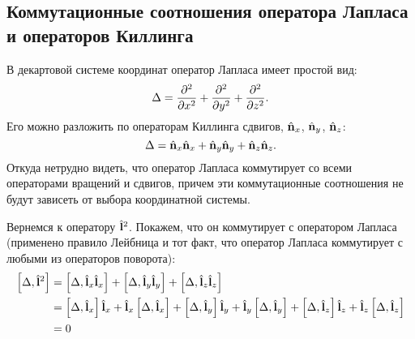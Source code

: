\documentclass[12pt,a4paper]{article}
\begin{document}

    \subsection{Коммутационные соотношения оператора Лапласа и операторов Киллинга}

        В декартовой системе координат оператор Лапласа имеет простой вид:
        \begin{equation}
            \Delta = \pdv[2]{x} + \pdv[2]{y} + \pdv[2]{z} .
        \end{equation}
        Его можно разложить по операторам Киллинга сдвигов, $\hat{\mathbf{n}}_x$, $\hat{\mathbf{n}}_y$, $\hat{\mathbf{n}}_z$:
        \begin{equation}
            \Delta = \hat{\mathbf{n}}_x\hat{\mathbf{n}}_x + \hat{\mathbf{n}}_y\hat{\mathbf{n}}_y + \hat{\mathbf{n}}_z\hat{\mathbf{n}}_z .
        \end{equation}
        Откуда нетрудно видеть, что оператор Лапласа коммутирует со всеми операторами вращений и сдвигов, причем эти коммутационные соотношения не будут зависеть от выбора координатной системы.

        Вернемся к оператору $\hat{\mathbf{l}}^2$. Покажем, что он коммутирует с оператором Лапласа (применено правило Лейбница и тот факт, что оператор Лапласа коммутирует с любыми из операторов поворота):
        \begin{equation}\begin{aligned}
            \left[ \Delta, \hat{\mathbf{l}}^2 \right]
                &= \left[ \Delta, \hat{\mathbf{l}}_x \hat{\mathbf{l}}_x \right]
                    + \left[ \Delta, \hat{\mathbf{l}}_y \hat{\mathbf{l}}_y \right]
                    + \left[ \Delta, \hat{\mathbf{l}}_z \hat{\mathbf{l}}_z \right] \\
                &= \left[ \Delta, \hat{\mathbf{l}}_x \right] \hat{\mathbf{l}}_x
                    + \hat{\mathbf{l}}_x \left[ \Delta, \hat{\mathbf{l}}_x \right]
                    + \left[ \Delta, \hat{\mathbf{l}}_y \right] \hat{\mathbf{l}}_y
                    + \hat{\mathbf{l}}_y \left[ \Delta, \hat{\mathbf{l}}_y \right]
                    + \left[ \Delta, \hat{\mathbf{l}}_z \right] \hat{\mathbf{l}}_z
                    + \hat{\mathbf{l}}_z \left[ \Delta, \hat{\mathbf{l}}_z \right] \\
                &= 0
        \end{aligned}\end{equation}
\end{document}
